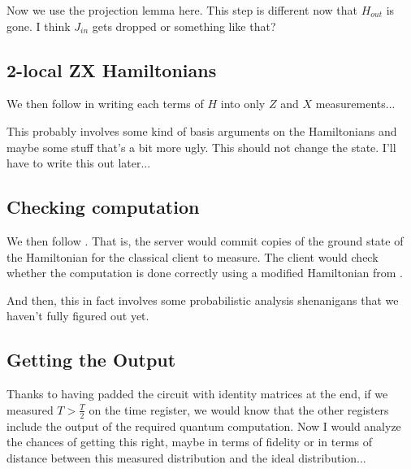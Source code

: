 Now we use the projection lemma here. This step is different now that $H_{out}$ is gone. I think $J_{in}$ gets dropped or something like that?

\subsection{2-local ZX Hamiltonians}

We then follow \cite{biamonte_love_2008} in writing each terms of $H$ into only $Z$ and $X$ measurements...

This probably involves some kind of basis arguments on the Hamiltonians and maybe some stuff that's a bit more ugly. This should not change the state. I'll have to write this out later...

\subsection{Checking computation}

We then follow \cite{mahadev_delegation}. That is, the server would commit copies of the ground state of the Hamiltonian for the classical client to measure. The client would check whether the computation is done correctly using a modified Hamiltonian from \cite{kempe_kitaev_regev_2006}. 

And then, this in fact involves some probabilistic analysis shenanigans that we haven't fully figured out yet.

\subsection{Getting the Output}

Thanks to having padded the circuit with identity matrices at the end, if we measured $T>\frac{T}{2}$ on the time register, we would know that the other registers include the output of the required quantum computation. Now I would analyze the chances of getting this right, maybe in terms of fidelity or in terms of distance between this measured distribution and the ideal distribution...


